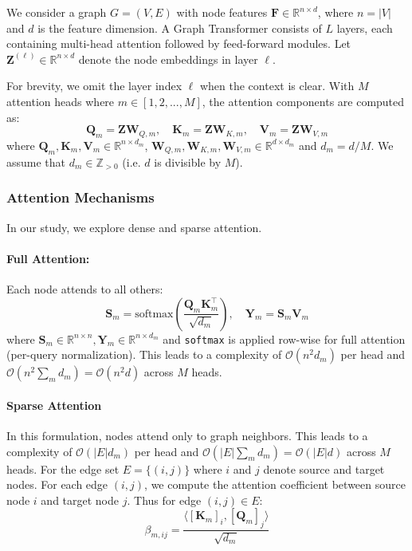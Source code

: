 \documentclass[lettersize,journal]{IEEEtran}
\begin{document}
We consider a graph $G = (V, E)$ with node features $\mathbf{F} \in \mathbb{R}^{n \times d}$, where $n = |V|$ and $d$ is the feature dimension. A Graph Transformer consists of $L$ layers, each containing multi-head attention followed by feed-forward modules. Let $\mathbf{Z}^{(\ell)} \in \mathbb{R}^{n \times d}$ denote the node embeddings in layer $\ell$.

For brevity, we omit the layer index $\ell$ when the context is clear. With $M$ attention heads where $m \in [1,2,...,M]$, the attention components are computed as:
\begin{equation}
\mathbf{Q}_m = \mathbf{Z} \mathbf{W}_{Q,m}, \quad
\mathbf{K}_m = \mathbf{Z} \mathbf{W}_{K,m}, \quad
\mathbf{V}_m = \mathbf{Z} \mathbf{W}_{V,m}
\end{equation}
where $\mathbf{Q}_m, \mathbf{K}_m, \mathbf{V}_m \in \mathbb{R}^{n \times d_m}$, $\mathbf{W}_{Q,m}, \mathbf{W}_{K,m}, \mathbf{W}_{V,m} \in \mathbb{R}^{d \times d_m}$ and $d_m = d/M$. 
We assume that $d_m \in \mathbb{Z}_{>0}$ (i.e. $d$ is divisible by $M$).\\

\subsubsection{Attention Mechanisms} In our study,
we explore dense and sparse attention.

\paragraph{Full Attention:} Each node attends to all others:
\begin{equation}
\mathbf{S}_m = \text{softmax}\left(\frac{\mathbf{Q}_m \mathbf{K}_m^{\top}}{\sqrt{d_m}}\right), \quad
\mathbf{Y}_m = \mathbf{S}_m \mathbf{V}_m
\end{equation}
where $\mathbf{S}_m \in \mathbb{R}^{n \times n}, \mathbf{Y}_m \in \mathbb{R}^{n \times d_m}$ and \texttt{softmax} is applied row-wise for full attention (per-query normalization).  This leads to a complexity of $\mathcal{O}(n^2 d_m)$ per head and $\mathcal{O}(n^2 \sum_m d_m) = \mathcal{O}(n^2 d)$ across $M$ heads.


\paragraph{Sparse Attention} In this formulation, nodes attend only to graph neighbors. This leads to a complexity of $\mathcal{O}(|E| d_m)$ per head and $\mathcal{O}(|E| \sum_m d_m) = \mathcal{O}(|E| d)$ across $M$ heads. For the edge set $E = \{(i, j)\}$ where $i$ and $j$ denote source and target nodes. For each edge $(i, j)$, we compute the attention coefficient between source node $i$ and target node $j$. Thus for edge $(i,j) \in E$:
\begin{equation}
\beta_{m,ij} = \frac{\langle [\mathbf{K}_m]_i, [\mathbf{Q}_m]_j \rangle}{\sqrt{d_m}}
\end{equation}
\end{document}

